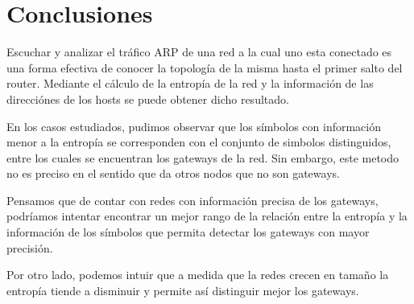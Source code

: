 \section{Conclusiones}

Escuchar y analizar el tráfico ARP de una red a la cual uno esta conectado es una forma efectiva
de conocer la topología de la misma hasta el primer salto del router. Mediante el cálculo de la
entropía de la red y la información de las direcciónes de los hosts se puede obtener dicho resultado.

En los casos estudiados, pudimos observar que los s\'imbolos con información menor a la entropía
se corresponden con el conjunto de simbolos distinguidos, entre los cuales se encuentran los
gateways de la red. Sin embargo, este metodo no es preciso en el sentido que da otros nodos que
no son gateways.

Pensamos que de contar con redes con informaci\'on precisa de los gateways, podr\'iamos intentar
encontrar un mejor rango de la relaci\'on entre la entrop\'ia y la informaci\'on de los s\'imbolos
que permita detectar los gateways con mayor precisi\'on.

Por otro lado, podemos intuir que a medida que la redes crecen en tamaño la entrop\'ia tiende a
disminuir y permite as\'i distinguir mejor los gateways. 
